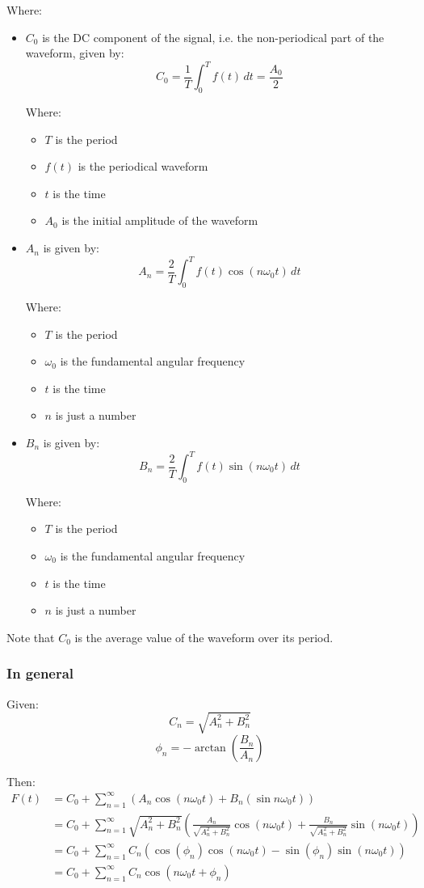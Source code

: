 \documentclass[11pt]{article}
\begin{document}
Where:
\begin{itemize}
\item \(C_0\) is the DC component of the signal, i.e. the non-periodical part of the waveform, given by:
\[C_0 = \frac{1}{T} \int_0^T f(t) \, dt = \frac{A_0}{2}\]

Where:
\begin{itemize}
\item \(T\) is the period
\item \(f(t)\) is the periodical waveform
\item \(t\) is the time
\item \(A_0\) is the initial amplitude of the waveform
\end{itemize}

\item \(A_n\) is given by:
\[A_n = \frac{2}{T} \int_0^T f(t) \cos (n \omega_0 t) \, dt\]

Where:
\begin{itemize}
\item \(T\) is the period
\item \(\omega_0\) is the fundamental angular frequency
\item \(t\) is the time
\item \(n\) is just a number
\end{itemize}

\item \(B_n\) is given by:
\[B_n = \frac{2}{T} \int_0^T f(t) \sin (n \omega_0 t) \, dt\]

Where:
\begin{itemize}
\item \(T\) is the period
\item \(\omega_0\) is the fundamental angular frequency
\item \(t\) is the time
\item \(n\) is just a number
\end{itemize}
\end{itemize}

Note that \(C_0\) is the average value of the waveform over its period.
\subsubsection{In general}
\label{sec:org6508395}
Given:
\[C_n = \sqrt{A_n^2 + B_n^2}\]
\[\phi_n = - \arctan \left(\frac{B_n}{A_n} \right)\]

Then:
\begin{align*}
F(t) &= C_0 + \sum_{n = 1}^{\infty} \left(A_n \cos (n \omega_0 t) + B_n (\sin n \omega_0 t) \right) \\
&= C_0 + \sum_{n = 1}^{\infty} \sqrt{A_n^2 + B_n^2} \left(\frac{A_n}{\sqrt{A_n^2 + B_n^2}} \cos (n \omega_0 t) + \frac{B_n}{\sqrt{A_n^2 + B_n^2}} \sin (n \omega_0 t) \right) \\
&= C_0 + \sum_{n = 1}^{\infty} C_n \left(\cos (\phi_n) \cos(n \omega_0 t) - \sin(\phi_n) \sin(n \omega_0 t) \right) \\
&= C_0 + \sum_{n = 1}^{\infty} C_n \cos (n \omega_0 t + \phi_n)
\end{align*}
\end{document}
